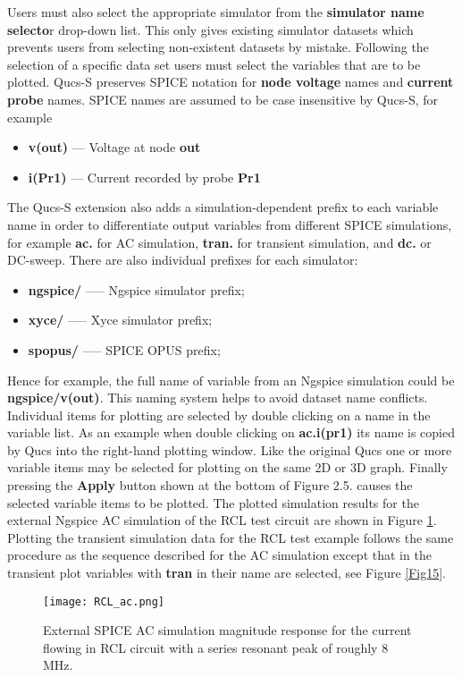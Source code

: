 \noindent Users must also select the appropriate simulator from the \textbf{simulator name selecto}r drop-down list. This only gives existing simulator datasets which prevents users from selecting non-existent datasets by mistake. Following the selection of a specific data set users must select the variables that are to be plotted.  Qucs-S preserves SPICE notation for \textbf{node voltage} names and \textbf{current probe} names.  SPICE names are assumed to be case insensitive by Qucs-S, for example

\begin{itemize}
	\item {\textbf{v(out)} --- Voltage at node \textbf{out} }
	\item {\textbf{i(Pr1)} --- Current recorded by probe \textbf{Pr1} }
\end{itemize}

\noindent The Qucs-S extension also adds a simulation-dependent prefix to each variable name in order to differentiate output variables from different SPICE simulations, for example \textbf{ac.} for AC simulation, \textbf{tran.} for transient simulation, and \textbf{ dc.} or DC-sweep. There are also individual prefixes for each simulator:
\begin{itemize}
	\item {\textbf{ngspice/} ----- Ngspice simulator prefix; }
	\item {\textbf{xyce/}    ----- Xyce simulator prefix; }
    \item {\textbf{spopus/}  ----- SPICE OPUS prefix; }
\end{itemize}

\noindent Hence for example, the full name of variable from an Ngspice simulation could be \textbf{ ngspice/v(out)}.
This naming system helps to avoid dataset name conflicts. Individual items for plotting are selected by double clicking on a name in the variable list. As an example when double clicking on \textbf{ac.i(pr1)} its name is copied by Qucs into the right-hand plotting window.  Like the original Qucs one or more variable items may be selected for plotting on the same 2D or 3D graph. Finally pressing the \textbf{Apply} button shown at the bottom of Figure 2.5. causes the selected variable items to be plotted. The plotted simulation results for the external Ngspice AC simulation of the RCL test circuit are shown in Figure \ref{Fig14}. Plotting the transient simulation data for the RCL test example follows the same procedure as the sequence described for the AC simulation except that in the transient plot variables with\textbf{ tran} in their name are selected, see Figure \ref{Fig15}.
 \begin{figure}[h]
	\centering
	\texttt{[image: RCL\_ac.png]}
	\caption{ External SPICE AC simulation magnitude response for the current flowing in
    RCL circuit with a series resonant peak of roughly 8 MHz.  }
	\label{Fig14}
\end{figure}


